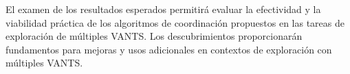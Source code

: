 \documentclass[sigconf]{acmart}
\begin{document}
El examen de los resultados esperados permitirá evaluar la efectividad y la viabilidad práctica de los algoritmos de coordinación propuestos en las tareas de exploración de múltiples VANTS. Los descubrimientos proporcionarán fundamentos para mejoras y usos adicionales en contextos de exploración con múltiples VANTS.

    









\end{document}

